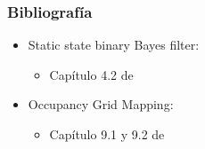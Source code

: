\begin{frame}
	\frametitle{Bibliografía}
   
    \begin{itemize}
        \item Static state binary Bayes filter:

        \begin{itemize}
            \item Capítulo 4.2 de \cite{thrun2005probabilistic}
        \end{itemize}
        
        \item Occupancy Grid Mapping:
        
        \begin{itemize}
            \item Capítulo 9.1 y 9.2 de \cite{thrun2005probabilistic}
        \end{itemize}

    \end{itemize}

	\printbibliography
	
\end{frame}